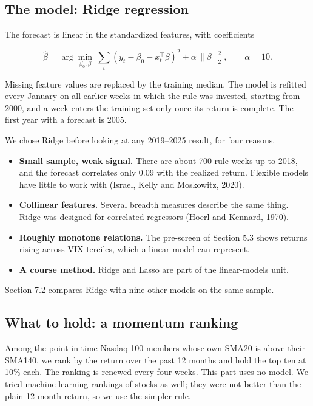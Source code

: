 \documentclass[11pt]{article}
\providecommand{\tightlist}{\setlength{\itemsep}{2pt}\setlength{\parskip}{0pt}}
\begin{document}
\subsection{The model: Ridge regression}

The forecast is linear in the standardized features, with coefficients

\[\hat\beta = \arg\min_{\beta_0,\beta}\ \sum_t \left(y_t - \beta_0 - x_t^\top\beta\right)^2 + \alpha\,\lVert\beta\rVert_2^2, \qquad \alpha = 10 .\]

Missing feature values are replaced by the training median. The model is refitted every January on all earlier weeks in which the rule was invested, starting from 2000, and a week enters the training set only once its return is complete. The first year with a forecast is 2005.

We chose Ridge before looking at any 2019--2025 result, for four reasons.

\begin{itemize}
\tightlist
\item
  \textbf{Small sample, weak signal.} There are about 700 rule weeks up to 2018, and the forecast correlates only 0.09 with the realized return. Flexible models have little to work with (Israel, Kelly and Moskowitz, 2020).
\item
  \textbf{Collinear features.} Several breadth measures describe the same thing. Ridge was designed for correlated regressors (Hoerl and Kennard, 1970).
\item
  \textbf{Roughly monotone relations.} The pre-screen of Section 5.3 shows returns rising across VIX terciles, which a linear model can represent.
\item
  \textbf{A course method.} Ridge and Lasso are part of the linear-models unit.
\end{itemize}

Section 7.2 compares Ridge with nine other models on the same sample.

\subsection{What to hold: a momentum ranking}

Among the point-in-time Nasdaq-100 members whose own SMA20 is above their SMA140, we rank by the return over the past 12 months and hold the top ten at 10\% each. The ranking is renewed every four weeks. This part uses no model. We tried machine-learning rankings of stocks as well; they were not better than the plain 12-month return, so we use the simpler rule.
\end{document}
